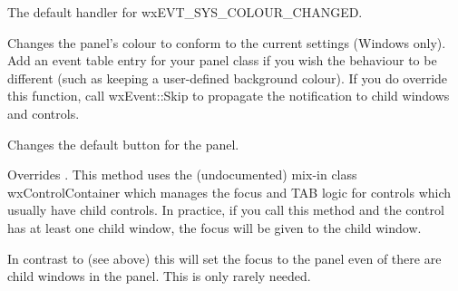\label{wxpanelonsyscolourchanged}


The default handler for wxEVT\_SYS\_COLOUR\_CHANGED.




Changes the panel's colour to conform to the current settings (Windows only).
Add an event table entry for your panel class if you wish the behaviour
to be different (such as keeping a user-defined
background colour). If you do override this function, call wxEvent::Skip to
propagate the notification to child windows and controls.




\label{wxpanelsetdefaultitem}


Changes the default button for the panel.




\label{wxpanelsetfocus}


Overrides . This method
uses the (undocumented) mix-in class wxControlContainer which manages
the focus and TAB logic for controls which usually have child controls.
In practice, if you call this method and the control has at least
one child window, the focus will be given to the child window.




\label{wxpanelsetfocusignoringchildren}


In contrast to  (see above)
this will set the focus to the panel even of there are child windows
in the panel. This is only rarely needed.



